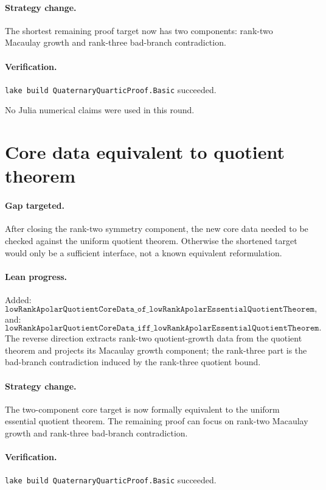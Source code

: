 \documentclass[11pt]{article}
\begin{document}
\paragraph{Strategy change.}
The shortest remaining proof target now has two components: rank-two Macaulay
growth and rank-three bad-branch contradiction.

\paragraph{Verification.}
\texttt{lake build QuaternaryQuarticProof.Basic} succeeded.

No Julia numerical claims were used in this round.

\section*{Core data equivalent to quotient theorem}

\paragraph{Gap targeted.}
After closing the rank-two symmetry component, the new core data needed to be
checked against the uniform quotient theorem.  Otherwise the shortened target
would only be a sufficient interface, not a known equivalent reformulation.

\paragraph{Lean progress.}
Added:
\[
\texttt{lowRankApolarQuotientCoreData\_of\_lowRankApolarEssentialQuotientTheorem},
\]
and:
\[
\texttt{lowRankApolarQuotientCoreData\_iff\_lowRankApolarEssentialQuotientTheorem}.
\]
The reverse direction extracts rank-two quotient-growth data from the quotient
theorem and projects its Macaulay growth component; the rank-three part is the
bad-branch contradiction induced by the rank-three quotient bound.

\paragraph{Strategy change.}
The two-component core target is now formally equivalent to the uniform
essential quotient theorem.  The remaining proof can focus on rank-two
Macaulay growth and rank-three bad-branch contradiction.

\paragraph{Verification.}
\texttt{lake build QuaternaryQuarticProof.Basic} succeeded.
\end{document}
